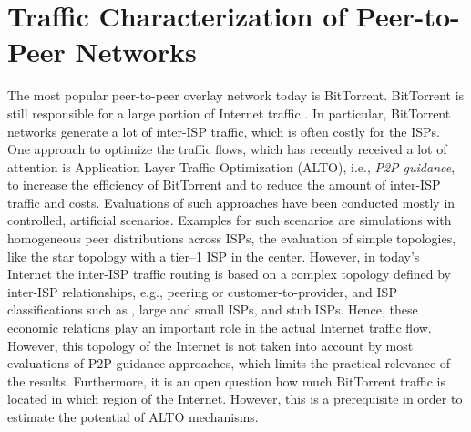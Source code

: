 \section{Traffic Characterization of Peer-to-Peer Networks}\label{sec:aslevel:p2p}

The most popular peer-to-peer overlay network today is BitTorrent.
BitTorrent is still responsible for a large portion of Internet traffic \cite{Cisc15,wamser2010}. In particular, BitTorrent networks generate a lot of inter-ISP traffic, which is often costly for the ISPs. One approach to optimize the traffic flows, which has recently received a lot of attention is Application Layer Traffic Optimization (ALTO), i.e., \textit{P2P guidance}, to increase the efficiency of BitTorrent and to reduce the amount of inter-ISP traffic and costs. Evaluations of such approaches have been conducted mostly in controlled, artificial scenarios. Examples for such scenarios are simulations with homogeneous peer distributions across ISPs, the evaluation of simple topologies, like the star topology with a tier--1 ISP in the center. However, in today's Internet the inter-ISP traffic routing is based on a complex topology defined by inter-ISP relationships, e.g., peering or customer-to-provider, and ISP classifications such as \tier, large and small ISPs, and stub ISPs. Hence, these economic relations play an important role in the actual Internet traffic flow. However, this topology of the Internet is not taken into account by most evaluations of P2P guidance approaches, which limits the practical relevance of the results. Furthermore, it is an open question how much BitTorrent traffic is located in which region of the Internet. However, this is a prerequisite in order to estimate the potential of ALTO mechanisms.

